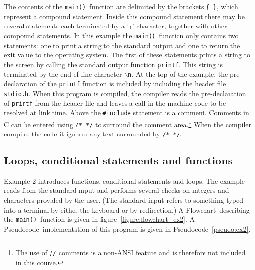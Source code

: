 \documentclass[11pt]{scrartcl}
\def\main{\texttt{main()}}
\def\psc{Pseudocode}
\def\flo{Flowchart}
\begin{document}
The contents of the \main\ function are delimited by the brackets
\texttt{\{ \}}, which represent a compound statement.  Inside this
compound statement there may be several statements each terminated by a
`\texttt{;}' character, together with other compound statements.  In this example the \main\ function only contains two statements: one to print a string to the standard output and one to return the exit value to the operating system.  The first of these statements prints a string to the screen by calling the standard output function \texttt{printf}.  This string is terminated by the end of line character \texttt{$\backslash$n}.  At the top of the example, the pre-declaration of the \texttt{printf} function is included by including the header file \texttt{stdio.h}.  When this program is compiled, the compiler reads the pre-declaration of \texttt{printf}
from the header file and leaves a call in the machine code to be
resolved at link time.  Above the \texttt{\#include} statement is a
comment.  Comments in C can be entered using
\texttt{/* */} to surround the comment area.\footnote{The use of
\texttt{//} comments is a non-ANSI feature and is therefore not
included in this course.}  When the compiler compiles the code it
ignores any text surrounded by \texttt{/* */}.

\clearpage
\newpage

\subsection{Loops, conditional statements and functions}
Example 2 introduces functions, conditional statements and loops.
The example reads from the standard input and performs several
checks on integers and characters provided by the user.  (The standard
input refers to something typed into a terminal by either the keyboard
or by redirection.)  A \flo\ describing the \main\ function is
given in figure~\ref{figure:flowchart_ex2}.  A \psc\
implementation of this program is given in \psc~\ref{pseudo:ex2}.
\end{document}
